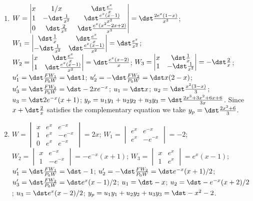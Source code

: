 \documentclass[openany]{book}
\newenvironment{sectionSolutions}{
 \begin{enumerate}[item-label={\thesection.\arabic{enumi}.}]
}{
 \end{enumerate}
}
\begin{document}
\begin{sectionSolutions}
\item
$W=\begin{vmatrix}
x&1/x&\dst\frac{e^x}{ x}\\1&-\dst\frac{1}{ x^2}&\dst\frac{e^x(x-1)}{ x^2}\\
0&\dst\frac{2}{ x^3}&\dst\frac{e^x(x^2-2x+2)}{ x^3}
\end{vmatrix}=\dst\frac{2e^x(1-x)}{ x^3}$;
$W_1=\begin{vmatrix}
\dst\frac{1}{ x}&\dst\frac{e^x}{ x}\\-\dst\frac{1}{
x^2}&\dst\frac{e^x(x-1)}{ x^2}
\end{vmatrix}=\dst\frac{e^x}{ x^2}$;
$W_2=\begin{vmatrix}
x&\dst\frac{e^x}{ x}\\
1&\dst\frac{e^x(x-1)}{ x^2}
\end{vmatrix}=\dst\frac{e^x(x-2)}{ x}$;
$W_3=\begin{vmatrix}
x&\dst\frac{1}{ x}\\
1&-\dst\frac{1}{ x^2}
\end{vmatrix}=-\dst\frac{2}{ x}$;
$u_1'=\dst\frac{FW_1}{ P_0W}=\dst1$;
$u_2'=-\dst\frac{FW_2}{ P_0W}=\dst x(2-x)$;
$u_3'=\dst\frac{FW_2}{ P_0W}=\dst-2xe^{-x}$;
$u_1=\dst x$;
$u_2=\dst \frac{x^2(3-x)}{ 3}$;
$u_3=\dst2e^{-x}(x+1)$;
$y_p=u_1y_1+u_2y_2+u_3y_3=\dst\frac{2x^3+3x^2+6x+6}{ 3x}$.
Since $x+\dst\frac{2}{ x}$ satisfies the complementary equation
we take $y_p=\dst\frac{2x^2+6}{3}$.


\item
$W=\begin{vmatrix}x&e^x&e^{-x}\\
1&e^x&-e^{-x}\\0&e^x&e^{-x}
\end{vmatrix}=2x$;
$W_1=\begin{vmatrix}
e^x&e^{-x}\\e^x&-e^{-x}
\end{vmatrix}=-2$;
$W_2=\begin{vmatrix}
x&e^{-x}\\1&-e^{-x}
\end{vmatrix}=-e^{-x}(x+1)$;
$W_3=\begin{vmatrix}x&e^x\\1&e^x
\end{vmatrix}=e^x(x-1)$;
$u_1'=\dst\frac{FW_1}{ P_0W}=\dst-1$;
$u_2'=-\dst\frac{FW_2}{ P_0W}=\dst e^{-x}(x+1)/2$;
$u_3'=\dst\frac{FW_2}{ P_0W}=\dst e^x(x-1)/2$;
$u_1=\dst-x$;
$u_2=\dst-e^{-x}(x+2)/2$;
$u_3=\dst e^x(x-2)/2$;
$y_p=u_1y_1+u_2y_2+u_3y_3=\dst-x^2-2$.




\end{sectionSolutions}
\end{document}
